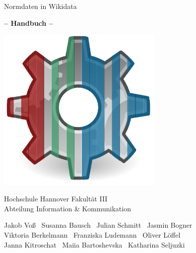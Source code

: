 \documentclass[
    a5paper,pagesize,
    10pt,
    ngerman
]{scrartcl}
\begin{document}
\pagestyle{empty}
\noindent

\begin{center}
\sffamily

\vspace{2cm}
{
  {\huge Normdaten in Wikidata}
  \vspace{0.5cm}
  
  {\bfseries\LARGE -- Handbuch -- }
  \vspace{0.5cm}

}
  
\vspace{1.5cm}

\includegraphics[width=8cm]{../images/Reasonator_logo_proposal.png}

\vspace{2.5cm}

{
  \large
  Hochschule Hannover Fakultät III\\
  Abteilung Information \& Kommunikation
}

\vspace{0.35cm}

Jakob Voß \textbar\ Susanna Bausch \textbar\ Julian Schmitt \textbar\ Jasmin Bogner \\
Viktoria Berkelmann \textbar\ Franziska Ludemann \textbar\ Oliver Löffel \\
Janna Kitroschat \textbar\ Maiia Bartoshevska \textbar\ Katharina Seljuzki

\end{center}
\end{document}
